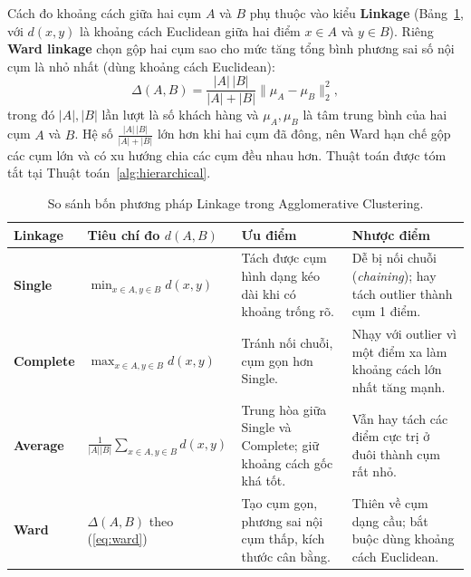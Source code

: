 \documentclass[12pt,a4paper]{article}
\numberwithin{equation}{section}
\numberwithin{table}{section}
\numberwithin{figure}{section}
\begin{document}
Cách đo khoảng cách giữa hai cụm $A$ và $B$ phụ thuộc vào kiểu \textbf{Linkage} (Bảng~\ref{tab:linkage_theory}, với $d(x, y)$ là khoảng cách Euclidean giữa hai điểm $x \in A$ và $y \in B$). Riêng \textbf{Ward linkage} chọn gộp hai cụm sao cho mức tăng tổng bình phương sai số nội cụm là nhỏ nhất (dùng khoảng cách Euclidean):
\begin{equation}
    \Delta(A, B) = \frac{|A|\,|B|}{|A| + |B|} \lVert \mu_A - \mu_B \rVert_2^2,
    \label{eq:ward}
\end{equation}
trong đó $|A|, |B|$ lần lượt là số khách hàng và $\mu_A, \mu_B$ là tâm trung bình của hai cụm $A$ và $B$. Hệ số $\frac{|A|\,|B|}{|A| + |B|}$ lớn hơn khi hai cụm đã đông, nên Ward hạn chế gộp các cụm lớn và có xu hướng chia các cụm đều nhau hơn. Thuật toán được tóm tắt tại Thuật toán~\ref{alg:hierarchical}.

\begin{table}[H]
\centering
\small
\begin{tabularx}{\textwidth}{@{}l>{\raggedright\arraybackslash}p{3.5cm}>{\raggedright\arraybackslash}X>{\raggedright\arraybackslash}X@{}}
\toprule
\textbf{Linkage} & \textbf{Tiêu chí đo $d(A, B)$} & \textbf{Ưu điểm} & \textbf{Nhược điểm} \\
\midrule
\textbf{Single} & $\min_{x\in A, y\in B} d(x,y)$ & Tách được cụm hình dạng kéo dài khi có khoảng trống rõ. & Dễ bị nối chuỗi (\emph{chaining}); hay tách outlier thành cụm 1 điểm. \\
\textbf{Complete} & $\max_{x\in A, y\in B} d(x,y)$ & Tránh nối chuỗi, cụm gọn hơn Single. & Nhạy với outlier vì một điểm xa làm khoảng cách lớn nhất tăng mạnh. \\
\textbf{Average} & $\frac{1}{|A||B|}\sum_{x\in A, y\in B} d(x,y)$ & Trung hòa giữa Single và Complete; giữ khoảng cách gốc khá tốt. & Vẫn hay tách các điểm cực trị ở đuôi thành cụm rất nhỏ. \\
\textbf{Ward} & $\Delta(A,B)$ theo (\ref{eq:ward}) & Tạo cụm gọn, phương sai nội cụm thấp, kích thước cân bằng. & Thiên về cụm dạng cầu; bắt buộc dùng khoảng cách Euclidean. \\
\bottomrule
\end{tabularx}
\caption{So sánh bốn phương pháp Linkage trong Agglomerative Clustering.}
\label{tab:linkage_theory}
\end{table}
\end{document}
